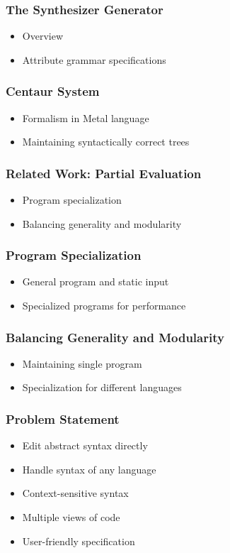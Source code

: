 \documentclass[t,24pt,aspectratio=169]{beamer}
\begin{document}
\begin{frame}[hvid]
    \frametitle{The Synthesizer Generator}
    \begin{itemize}
        \item Overview
        \item Attribute grammar specifications
    \end{itemize}
\end{frame}

\begin{frame}[hvid]
    \frametitle{Centaur System}
    \begin{itemize}
        \item Formalism in Metal language
        \item Maintaining syntactically correct trees
    \end{itemize}
\end{frame}

\begin{frame}[hvid]
    \frametitle{Related Work: Partial Evaluation}
    \begin{itemize}
        \item Program specialization
        \item Balancing generality and modularity
    \end{itemize}
\end{frame}

\begin{frame}[hvid]
    \frametitle{Program Specialization}
    \begin{itemize}
        \item General program and static input
        \item Specialized programs for performance
    \end{itemize}
\end{frame}

\begin{frame}[hvid]
    \frametitle{Balancing Generality and Modularity}
    \begin{itemize}
        \item Maintaining single program
        \item Specialization for different languages
    \end{itemize}
\end{frame}


\begin{frame}[hvid]
    \frametitle{Problem Statement}
    \begin{itemize}
        \item Edit abstract syntax directly
        \item Handle syntax of any language
        \item Context-sensitive syntax
        \item Multiple views of code
        \item User-friendly specification
    \end{itemize}
\end{frame}
\end{document}
